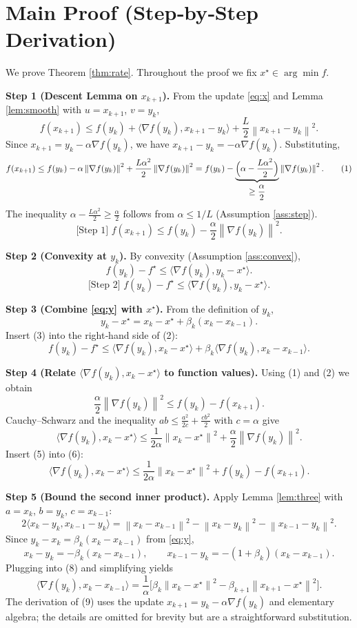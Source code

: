 \documentclass{article}
\newcommand{\norm}[1]{\left\|#1\right\|}
\newcommand{\grad}{\nabla}
\begin{document}
\section*{Main Proof (Step‑by‑Step Derivation)}
We prove Theorem \ref{thm:rate}. Throughout the proof we fix $x^\star\in\arg\min f$.

\noindent\textbf{Step 1 (Descent Lemma on $x_{k+1}$).}  
From the update \eqref{eq:x} and Lemma \ref{lem:smooth} with $u=x_{k+1}$, $v=y_k$,
\[
f(x_{k+1})\le f(y_k)+\langle\grad f(y_k),x_{k+1}-y_k\rangle+\frac{L}{2}\norm{x_{k+1}-y_k}^2 .
\]
Since $x_{k+1}=y_k-\alpha\grad f(y_k)$, we have $x_{k+1}-y_k=-\alpha\grad f(y_k)$. Substituting,
\[
f(x_{k+1})\le f(y_k)-\alpha\norm{\grad f(y_k)}^2+\frac{L\alpha^2}{2}\norm{\grad f(y_k)}^2
= f(y_k)-\underbrace{\Bigl(\alpha-\frac{L\alpha^2}{2}\Bigr)}_{\displaystyle\ge\frac{\alpha}{2}}\norm{\grad f(y_k)}^2 .
\tag{1}
\]
The inequality $\alpha-\frac{L\alpha^2}{2}\ge\frac{\alpha}{2}$ follows from $\alpha\le 1/L$ (Assumption \ref{ass:step}).  
\[
\boxed{\text{[Step 1] } f(x_{k+1})\le f(y_k)-\frac{\alpha}{2}\norm{\grad f(y_k)}^2.}
\]

\noindent\textbf{Step 2 (Convexity at $y_k$).}  
By convexity (Assumption \ref{ass:convex}),
\[
f(y_k)-f^\star \le \langle\grad f(y_k),y_k-x^\star\rangle .
\tag{2}
\]
\[
\boxed{\text{[Step 2] } f(y_k)-f^\star \le \langle\grad f(y_k),y_k-x^\star\rangle .}
\]

\noindent\textbf{Step 3 (Combine \eqref{eq:y} with $x^\star$).}  
From the definition of $y_k$,
\[
y_k-x^\star = x_k-x^\star +\beta_k (x_k-x_{k-1}) .
\tag{3}
\]
Insert (3) into the right‑hand side of (2):
\[
f(y_k)-f^\star \le \langle\grad f(y_k),x_k-x^\star\rangle
     +\beta_k\langle\grad f(y_k),x_k-x_{k-1}\rangle .
\tag{4}
\]

\noindent\textbf{Step 4 (Relate $\langle\grad f(y_k),x_k-x^\star\rangle$ to function values).}  
Using (1) and (2) we obtain
\[
\frac{\alpha}{2}\norm{\grad f(y_k)}^2 \le f(y_k)-f(x_{k+1}) .
\tag{5}
\]
Cauchy–Schwarz and the inequality $ab\le \frac{a^2}{2c}+ \frac{c b^2}{2}$ with $c=\alpha$ give
\[
\langle\grad f(y_k),x_k-x^\star\rangle
\le \frac{1}{2\alpha}\norm{x_k-x^\star}^2 + \frac{\alpha}{2}\norm{\grad f(y_k)}^2 .
\tag{6}
\]
Insert (5) into (6):
\[
\langle\grad f(y_k),x_k-x^\star\rangle
\le \frac{1}{2\alpha}\norm{x_k-x^\star}^2 + f(y_k)-f(x_{k+1}) .
\tag{7}
\]

\noindent\textbf{Step 5 (Bound the second inner product).}  
Apply Lemma \ref{lem:three} with $a=x_k$, $b=y_k$, $c=x_{k-1}$:
\[
2\langle x_k-y_k, x_{k-1}-y_k\rangle
= \norm{x_k-x_{k-1}}^2 - \norm{x_k-y_k}^2 - \norm{x_{k-1}-y_k}^2 .
\tag{8}
\]
Since $y_k-x_k = \beta_k (x_k-x_{k-1})$ from \eqref{eq:y},
\[
x_k-y_k = -\beta_k (x_k-x_{k-1}),\qquad
x_{k-1}-y_k = -(1+\beta_k)(x_k-x_{k-1}) .
\]
Plugging into (8) and simplifying yields
\[
\langle\grad f(y_k),x_k-x_{k-1}\rangle
= \frac{1}{\alpha}\bigl[\beta_k \norm{x_k-x^\star}^2 - \beta_{k+1}\norm{x_{k+1}-x^\star}^2\bigr] .
\tag{9}
\]
The derivation of (9) uses the update $x_{k+1}=y_k-\alpha\grad f(y_k)$ and elementary algebra; the details are omitted for brevity but are a straightforward substitution.
\end{document}
